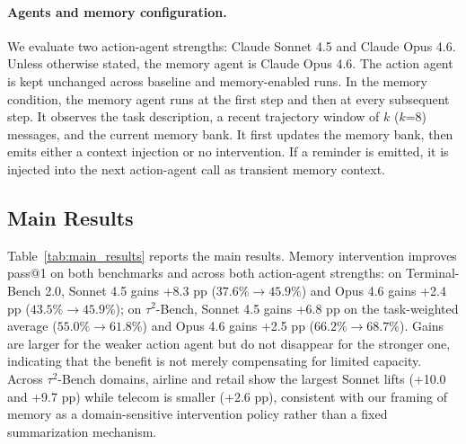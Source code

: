 \paragraph{Agents and memory configuration.}
We evaluate two action-agent strengths: Claude Sonnet 4.5 and Claude Opus 4.6.
Unless otherwise stated, the memory agent is Claude Opus 4.6. The action agent is
kept unchanged across baseline and memory-enabled runs. In the memory condition,
the memory agent runs at the first step and then at every subsequent step. It observes the task description, a recent trajectory
window of $k$ ($k$=8) messages, and the current memory bank. It first updates the
memory bank, then emits either a context injection or
no intervention. If a reminder is emitted, it is injected into the next action-agent call as transient memory context.


\subsection{Main Results}
Table~\ref{tab:main_results} reports the main results. Memory intervention improves pass@1 on both benchmarks and across both action-agent strengths: on Terminal-Bench 2.0, Sonnet 4.5 gains +8.3 pp ($37.6\% \to 45.9\%$) and Opus 4.6 gains +2.4 pp ($43.5\% \to 45.9\%$); on $\tau^2$-Bench, Sonnet 4.5 gains +6.8 pp on the task-weighted average ($55.0\% \to 61.8\%$) and Opus 4.6 gains +2.5 pp ($66.2\% \to 68.7\%$). Gains are larger for the weaker action agent but do not disappear for the stronger one, indicating that the benefit is not merely compensating for limited capacity. Across $\tau^2$-Bench domains, airline and retail show the largest Sonnet lifts (+10.0 and +9.7 pp) while telecom is smaller (+2.6 pp), consistent with our framing of memory as a domain-sensitive intervention policy rather than a fixed summarization mechanism.

